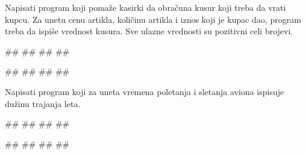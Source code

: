 \begin{Exercise}[label=UZ_NI_06] 
Napisati program koji pomaže kasirki da obračuna kusur koji treba da vrati kupcu. 
Za unetu cenu artikla, količinu artikla i iznos koji je kupac dao, program treba da 
ispiše vrednost kusura. Sve ulazne vrednosti su pozitivni celi brojevi. 

\begin{miditest}
\begin{upotreba}{1}
#\naslovInt#
##
##
##
\end{upotreba}
\end{miditest}
\begin{miditest}
\begin{upotreba}{2}
#\naslovInt#
##
##
##
\end{upotreba}
\end{miditest}

\end{Exercise}
\ifresenja
\begin{Answer}[ref=UZ_NI_06]
\end{Answer}
\fi


\begin{Exercise}[label=UZ_NI_07] 
Napisati program koji za uneta vremena poletanja i sletanja aviona ispisuje dužinu trajanja leta. 

\begin{miditest}
\begin{upotreba}{1}
#\naslovInt#
##
##
##
\end{upotreba}
\end{miditest}
\begin{miditest}
\begin{upotreba}{2}
#\naslovInt#
##
##
##
\end{upotreba}
\end{miditest}

\end{Exercise}
\ifresenja
\begin{Answer}[ref=UZ_NI_07]
\end{Answer}
\fi

